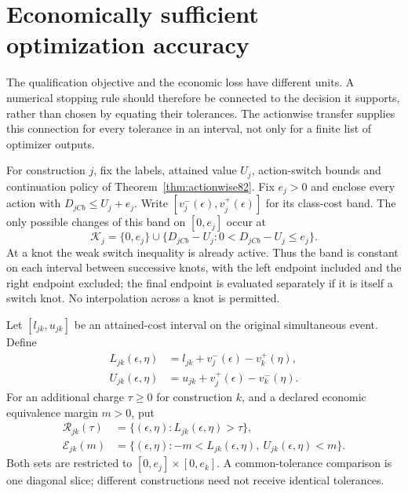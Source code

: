 \section{Economically sufficient optimization accuracy}\label{sec:frontier83}
The qualification objective and the economic loss have different units. A numerical stopping rule should therefore be connected to the decision it supports, rather than chosen by equating their tolerances. The actionwise transfer supplies this connection for every tolerance in an interval, not only for a finite list of optimizer outputs.

For construction $j$, fix the labels, attained value $U_j$, action-switch bounds and continuation policy of Theorem~\ref{thm:actionwise82}. Fix $e_j>0$ and enclose every action with $D_{jCb}\le U_j+e_j$. Write $[v_j^-(\epsilon),v_j^+(\epsilon)]$ for its class-cost band. The only possible changes of this band on $[0,e_j]$ occur at
\[
 \mathcal K_j=\{0,e_j\}\cup
       \{D_{jCb}-U_j:0<D_{jCb}-U_j\le e_j\}.
\]
At a knot the weak switch inequality is already active. Thus the band is constant on each interval between successive knots, with the left endpoint included and the right endpoint excluded; the final endpoint is evaluated separately if it is itself a switch knot. No interpolation across a knot is permitted.

Let $[l_{jk},u_{jk}]$ be an attained-cost interval on the original simultaneous event. Define
\begin{align}
 L_{jk}(\epsilon,\eta)&=l_{jk}+v_j^-(\epsilon)-v_k^+(\eta),\label{eq:lower-frontier83}\\
 U_{jk}(\epsilon,\eta)&=u_{jk}+v_j^+(\epsilon)-v_k^-(\eta).\label{eq:upper-frontier83}
\end{align}
For an additional charge $\tau\ge0$ for construction $k$, and a declared economic equivalence margin $m>0$, put
\begin{align*}
 \mathcal R_{jk}(\tau)&=\{(\epsilon,\eta):L_{jk}(\epsilon,\eta)>\tau\},\\
 \mathcal E_{jk}(m)&=\{(\epsilon,\eta):-m<L_{jk}(\epsilon,\eta),\ U_{jk}(\epsilon,\eta)<m\}.
\end{align*}
Both sets are restricted to $[0,e_j]\times[0,e_k]$. A common-tolerance comparison is one diagonal slice; different constructions need not receive identical tolerances.

